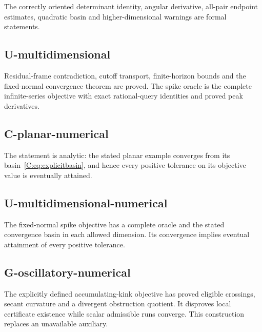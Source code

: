 The correctly oriented determinant identity, angular derivative, all-pair endpoint estimates, quadratic basin and higher-dimensional warnings are formal statements.



\subsection{U-multidimensional}\label{u-multidimensional}

Residual-frame contradiction, cutoff transport, finite-horizon bounds and the fixed-normal convergence theorem are proved. The spike oracle is the complete infinite-series objective with exact rational-query identities and proved peak derivatives.



\subsection{C-planar-numerical}\label{c-planar-numerical}

The statement is analytic: the stated planar example converges from its basin~\eqref{C:eq:explicitbasin}, and hence every positive tolerance on its objective value is eventually attained.



\subsection{U-multidimensional-numerical}\label{u-multidimensional-numerical}

The fixed-normal spike objective has a complete oracle and the stated convergence basin in each allowed dimension. Its convergence implies eventual attainment of every positive tolerance.



\subsection{G-oscillatory-numerical}\label{g-oscillatory-numerical}

The explicitly defined accumulating-kink objective has proved eligible crossings, secant curvature and a divergent obstruction quotient. It disproves local certificate existence while scalar admissible runs converge. This construction replaces an unavailable auxiliary.

